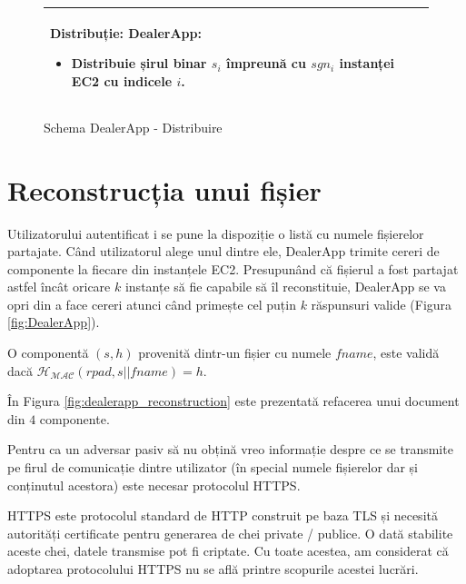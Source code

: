 \documentclass[oneside, 12pt]{book}
\begin{document}
\begin{figure}[h!]
\begin{tabular}{|p{\textwidth}|}
\medskip
\hspace{.1in}	
\textbf{Distribuție}: DealerApp:
	\begin{itemize}
		\item Distribuie șirul binar $s_i$ împreună cu $sgn_i$ instanței EC2 cu indicele $i$.
	\end{itemize}

\\
\hline
\end{tabular}
\caption{Schema DealerApp - Distribuire}
\label{fig:dealerapp_distribution}
\end{figure}


\section{Reconstrucția unui fișier}

Utilizatorului autentificat i se pune la dispoziție o listă cu numele fișierelor partajate. Când utilizatorul alege unul dintre ele, DealerApp trimite cereri de componente la fiecare din instanțele EC2. Presupunând că fișierul a fost partajat astfel încât oricare $k$ instanțe să fie capabile să îl reconstituie, DealerApp se va opri din a face cereri atunci când primește cel puțin $k$ răspunsuri valide (Figura \ref{fig:DealerApp}).

O componentă $(s, h)$ provenită dintr-un fișier cu numele $fname$, este validă dacă $\mathcal{H_{MAC}}(rpad, s || fname) = h$.

În Figura \ref{fig:dealerapp_reconstruction} este prezentată refacerea unui document din $4$ componente.

Pentru ca un adversar pasiv să nu obțină vreo informație despre ce se transmite pe firul de comunicație dintre utilizator (în special numele fișierelor dar și conținutul acestora) este necesar protocolul HTTPS.

HTTPS este protocolul standard de HTTP construit pe baza TLS \cite{dierks2008transport} și necesită autorități certificate pentru generarea de chei private / publice. O dată stabilite aceste chei, datele transmise pot fi criptate. Cu toate acestea, am considerat că adoptarea protocolului HTTPS nu se află printre scopurile acestei lucrări.
\end{document}
